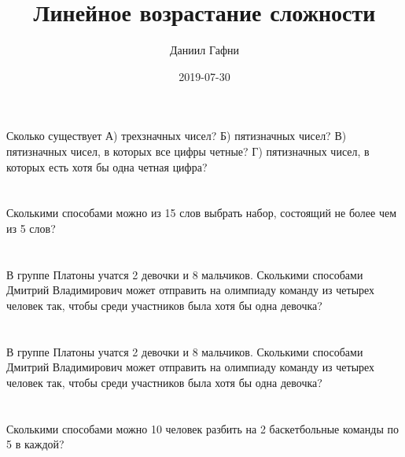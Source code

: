 \documentclass{article}%
\title{Линейное возрастание сложности}%
\author{Даниил Гафни}%
\date{2019{-}07{-}30}%
\begin{document}
%
\normalsize%
\maketitle%
\section{}%
\label{sec:}%
Сколько существует
А) трехзначных чисел?
Б) пятизначных чисел?
В) пятизначных чисел, в которых все цифры четные?
Г) пятизначных чисел, в которых есть хотя бы одна четная цифра?%
%
\iffalse%
Автор: Ираклий Гагуа%
Дата: 07{-}01{-}2011%
Название: None%
Подсказка: \textbackslash{}\textbackslash{}%
nan%
\fi

%
\section{}%
\label{sec:}%
Сколькими способами можно из 15 слов выбрать набор, состоящий не более чем
из 5 слов?%
%
\iffalse%
Автор: 25 школа%
Дата: 01{-}07{-}2017%
Название: None%
Подсказка: \textbackslash{}\textbackslash{}%
nan%
\fi

%
\section{}%
\label{sec:}%
В группе Платоны учатся 2 девочки и 8 мальчиков. Сколькими способами
Дмитрий Владимирович может отправить на олимпиаду команду из четырех человек
так, чтобы среди участников была хотя бы одна девочка?%
%
\iffalse%
Автор: 25 школа%
Дата: 01{-}07{-}2017%
Название: None%
Подсказка: \textbackslash{}\textbackslash{}%
nan%
\fi

%
\section{}%
\label{sec:}%
В группе Платоны учатся 2 девочки и 8 мальчиков. Сколькими способами
Дмитрий Владимирович может отправить на олимпиаду команду из четырех человек
так, чтобы среди участников была хотя бы одна девочка?%
%
\iffalse%
Автор: 25 школа%
Дата: 01{-}07{-}2017%
Название: None%
Подсказка: \textbackslash{}\textbackslash{}%
nan%
\fi

%
\section{}%
\label{sec:}%
Сколькими способами можно 10 человек разбить на 2 баскетбольные команды
по 5 в каждой?%
%
\iffalse%
Автор: 25 школа%
Дата: 01{-}07{-}2017%
Название: None%
Подсказка: \textbackslash{}\textbackslash{}%
nan%
\fi
\end{document}
